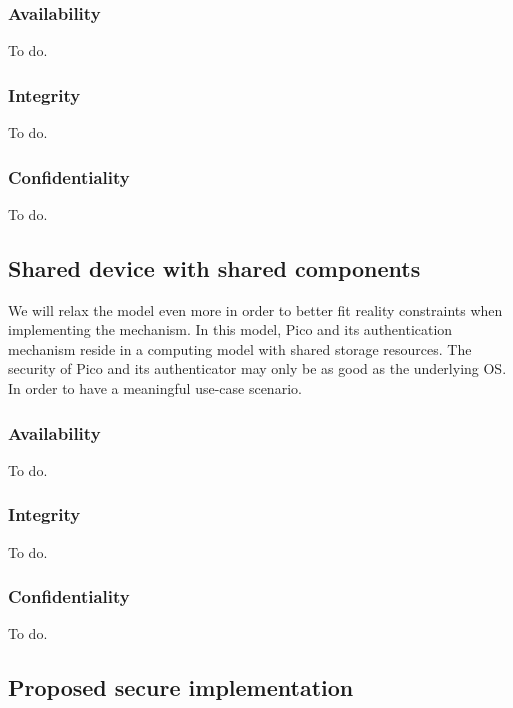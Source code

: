 	\subsubsection*{Availability}
	To do.
	
	\subsubsection*{Integrity}
	To do.
	
	\subsubsection*{Confidentiality}
	To do.

	
\subsection{Shared device with shared components}
We will relax the model even more in order to better fit reality constraints when implementing the mechanism. In this model, Pico and its authentication mechanism reside in a computing model with shared storage resources. The security of Pico and its authenticator may only be as good as the underlying OS. In order to have a meaningful use-case scenario.

	\subsubsection*{Availability}
	To do.
	
	\subsubsection*{Integrity}
	To do.
	
	\subsubsection*{Confidentiality}
	To do.

\subsection{Proposed secure implementation}

